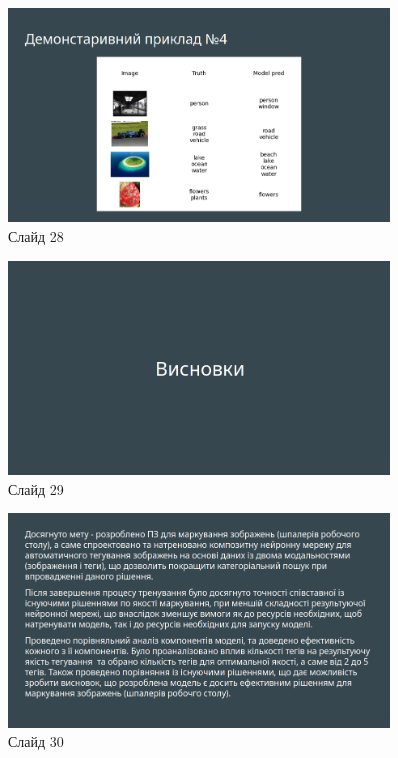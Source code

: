 \documentclass{udstu}
\begin{document}
\begin{figure}[!ht]
	\centering
	\includegraphics[width=0.9\textwidth]{PNG/present/present-28}
	\caption{Слайд 28}
\end{figure}

\begin{figure}[!ht]
	\centering
	\includegraphics[width=0.9\textwidth]{PNG/present/present-29}
	\caption{Слайд 29}
\end{figure}

\begin{figure}[!ht]
	\centering
	\includegraphics[width=0.9\textwidth]{PNG/present/present-30}
	\caption{Слайд 30}
\end{figure}
\end{document}

